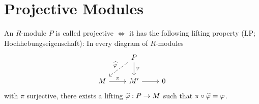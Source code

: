 \documentclass[a4paper]{report}
\begin{document}
\section{Projective Modules}
\begin{defi}
  An $R$-module $P$ is called projective $\iff$ it has the following lifting property (LP; Hochhebungseigenschaft): In every diagram of $R$-modules
  \[\begin{tikzcd}
                   & P \arrow[ld, "\hat \varphi"', dashed] \arrow[d, "\varphi"] &   \\
M \arrow[r, "\pi"] & M' \arrow[r]                                               & 0
\end{tikzcd}\]
with $\pi$ surjective, there exists a lifting $\widehat {\varphi} : P \to M$ such that $\pi \circ \widehat {\varphi} = \varphi$.
\end{defi}
\end{document}

